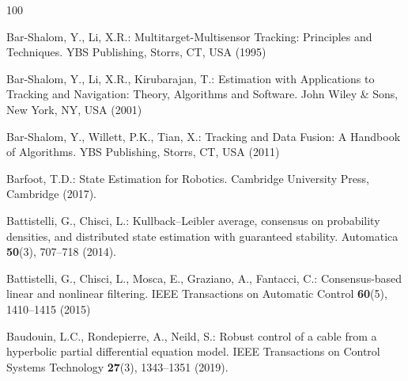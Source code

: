\documentclass[graybox,envcountchap]{style/SNmono}
\begin{document}
\begin{thebibliography}{100}
{\par}

Bar-Shalom, Y., Li, X.R.: Multitarget-Multisensor Tracking: Principles and
  Techniques.
\newblock YBS Publishing, Storrs, CT, USA (1995)



Bar-Shalom, Y., Li, X.R., Kirubarajan, T.: Estimation with Applications to
  Tracking and Navigation: Theory, Algorithms and Software.
\newblock John Wiley \& Sons, New York, NY, USA (2001)



Bar-Shalom, Y., Willett, P.K., Tian, X.: Tracking and Data Fusion: A Handbook
  of Algorithms.
\newblock YBS Publishing, Storrs, CT, USA (2011)



Barfoot, T.D.: State Estimation for Robotics.
\newblock Cambridge University Press, Cambridge (2017).
\newblock {}



Battistelli, G., Chisci, L.: Kullback--{L}eibler average, consensus on
  probability densities, and distributed state estimation with guaranteed
  stability.
\newblock Automatica \textbf{50}(3), 707--718 (2014).
\newblock {}


{\color{red} 
Battistelli, G., Chisci, L., Mosca, E., Graziano, A., Fantacci, C.:
  Consensus-based linear and nonlinear filtering.
\newblock IEEE Transactions on Automatic Control \textbf{60}(5), 1410--1415
  (2015)

\par}

Baudouin, L.C., Rondepierre, A., Neild, S.: Robust control of a cable from a
  hyperbolic partial differential equation model.
\newblock IEEE Transactions on Control Systems Technology \textbf{27}(3),
  1343--1351 (2019).
\newblock {}




\end{thebibliography}
\end{document}
